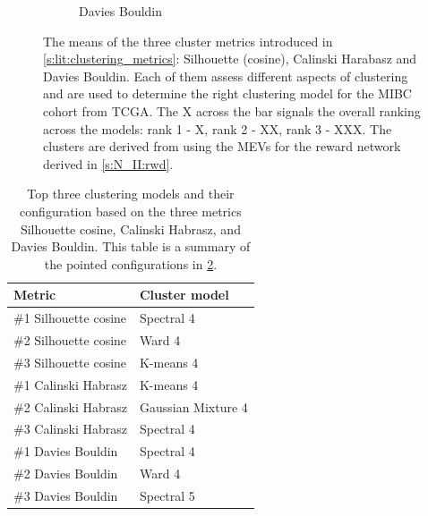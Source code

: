 \begin{figure}[H]
\begin{subfigure}[!t]{1.0\textwidth}
        \caption{Davies Bouldin}
        \label{fig:ap:n_II:dav_boul}
    \end{subfigure}
    \caption[Clustering analysis for the healthy reward network]{The means of the three cluster metrics introduced in \cref{s:lit:clustering_metrics}: Silhouette (cosine), Calinski Harabasz and Davies Bouldin. Each of them assess different aspects of clustering and are used to determine the right clustering model for the MIBC cohort from TCGA. The X across the bar signals the overall ranking across the models: rank 1 - X, rank 2 - XX, rank 3 - XXX. The clusters are derived from using the MEVs for the reward network derived in \cref{s:N_II:rwd}.}
    \label{fig:ap:n_II:cluster_metrics}
\end{figure}


\begin{table}[h!]
    \centering
    \begin{tabular}{|p{6cm}|p{6cm}|}
        \hline
        \textbf{Metric} & \textbf{Cluster model} \\
        \hline
        \#1 Silhouette cosine & \rule{0pt}{2.5ex} Spectral 4 \\
        \hline
        \#2 Silhouette cosine & \rule{0pt}{2.5ex} Ward 4 \\
        \hline
        \#3 Silhouette cosine & \rule{0pt}{2.5ex} K-means 4 \\
        \hline
        \#1 Calinski Habrasz & \rule{0pt}{2.5ex} K-means 4 \\
        \hline
        \#2 Calinski Habrasz & \rule{0pt}{2.5ex} Gaussian Mixture 4 \\
        \hline
        \#3 Calinski Habrasz & \rule{0pt}{2.5ex} Spectral 4 \\
        \hline
        \#1 Davies Bouldin & \rule{0pt}{2.5ex} Spectral 4 \\
        \hline
        \#2 Davies Bouldin & \rule{0pt}{2.5ex} Ward 4 \\
        \hline
        \#3 Davies Bouldin & \rule{0pt}{2.5ex} Spectral 5 \\
        \hline
    \end{tabular}
    \caption[Top performing clustering model]{Top three clustering models and their configuration based on the three metrics Silhouette cosine, Calinski Habrasz, and Davies Bouldin. This table is a summary of the pointed configurations in \cref{fig:ap:n_II:cluster_metrics}.}
    \label{tab:ap:N:II:top_3_cs}
\end{table}

